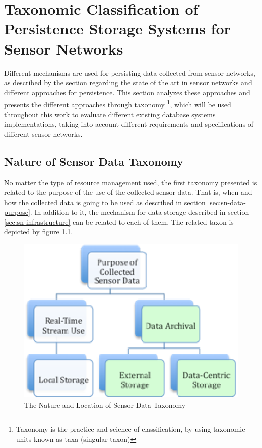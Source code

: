 

\chapter{Taxonomic Classification of Persistence Storage Systems for Sensor
Networks}
\label{chap:taxonomies}

Different mechanisms are used for persisting data collected from sensor
networks, as described by the section regarding the state of the art in sensor
networks and different approaches for persistence. This section analyzes these
approaches and presents the different approaches through taxonomy
\footnote{Taxonomy is the practice and science of classification, by using
taxonomic units known as taxa (singular taxon)}, which will be used throughout
this work to evaluate different existing database systems implementations,
taking into account different requirements and specifications of different
sensor networks.

\section{Nature of Sensor Data Taxonomy}

No matter the type of resource management used, the first taxonomy presented is
related to the purpose of the use of the collected sensor data. That is, when
and how the collected data is going to be used as described in section
\ref{sec:sn-data-purpose}. In addition to it, the mechanism for data storage
described in section \ref{sec:sn-infrastructure} can be related to each of
them. The related taxon is depicted by figure \ref{fig:taxonomy-data-purpose}.

\begin{figure}[h]
  \centering
  \includegraphics{../diagrams/taxonomy-data-purpose}
  \caption{The Nature and Location of Sensor Data Taxonomy}
  \label{fig:taxonomy-data-purpose}
\end{figure}

